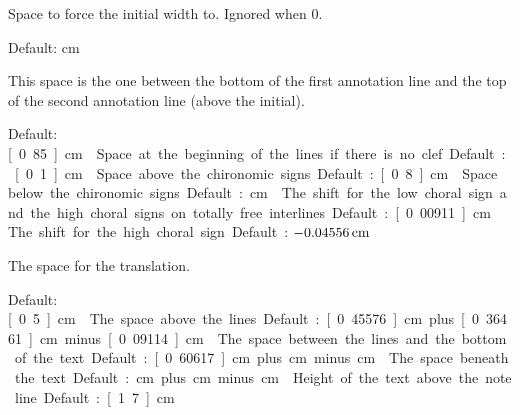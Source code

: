 Space to force the initial width to.  Ignored when 0.  

Default: \unit[0]{cm}

This space is the one between the bottom of the first annotation line and the top of the second annotation line (above the initial).  

Default: \unit[0.85]{cm}

Space at the beginning of the lines if there is no clef.  

Default: \unit[0.1]{cm}

Space above the chironomic signs.  

Default: \unit[0.8]{cm}

Space below the chironomic signs.  

Default: \unit[0]{cm}

The shift for the low choral sign and the high choral signs on totally free interlines.  

Default: \unit[0.00911]{cm}

The shift for the high choral sign.  

Default: $\unit[-0.04556]{cm}$

The space for the translation.  

Default: \unit[0.5]{cm}

The space above the lines.  

Default: \unit[0.45576]{cm} plus \unit[0.36461]{cm} minus \unit[0.09114]{cm}

The space between the lines and the bottom of the text.  

Default: \unit[0.60617]{cm} plus \unit[0]{cm} minus \unit[0]{cm}

The space beneath the text.  

Default: \unit[0]{cm} plus \unit[0]{cm} minus \unit[0]{cm}

Height of the text above the note line.  

Default: \unit[1.7]{cm}

